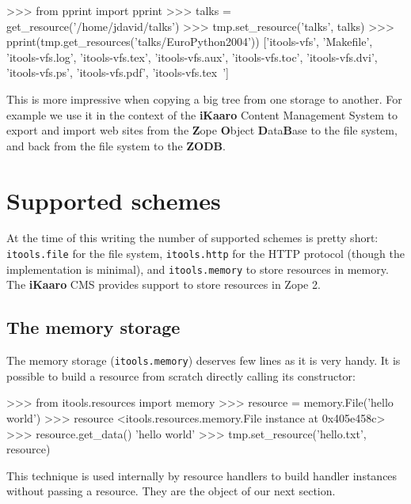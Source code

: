 \begin{code}
    >>> from pprint import pprint
    >>> talks = get_resource('/home/jdavid/talks')
    >>> tmp.set_resource('talks', talks)
    >>> pprint(tmp.get_resources('talks/EuroPython2004'))
    ['itools-vfs',
     'Makefile',
     'itools-vfs.log',
     'itools-vfs.tex',
     'itools-vfs.aux',
     'itools-vfs.toc',
     'itools-vfs.dvi',
     'itools-vfs.ps',
     'itools-vfs.pdf',
     'itools-vfs.tex~']
\end{code}

This is more impressive when copying a big tree from one storage to another.
For example we use it in the context of the {\bf iKaaro} Content Management
System to export and import web sites from the {\bf Z}ope {\bf O}bject
{\bf D}ata{\bf B}ase to the file system, and back from the file system to the
{\bf ZODB}.


\section{Supported schemes}

At the time of this writing the number of supported schemes is pretty short:
{\tt itools.file} for the file system, {\tt itools.http} for the HTTP
protocol (though the implementation is minimal), and {\tt itools.memory}
to store resources in memory. The {\bf iKaaro} CMS provides support to
store resources in Zope 2.

\subsection{The memory storage}

The memory storage ({\tt itools.memory}) deserves few lines as it is very
handy. It is possible to build a resource from scratch directly calling its
constructor:

\begin{code}
    >>> from itools.resources import memory
    >>> resource = memory.File('hello world')
    >>> resource
    <itools.resources.memory.File instance at 0x405e458c>
    >>> resource.get_data()
    'hello world'
    >>> tmp.set_resource('hello.txt', resource)
\end{code}

This technique is used internally by resource handlers to build handler
instances without passing a resource. They are the object of our next
section.
